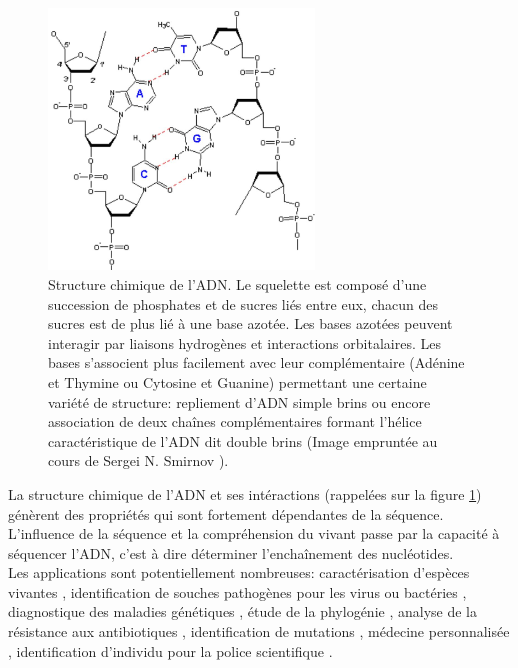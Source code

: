 \begin{figure}[H]
\begin{center}
\includegraphics[width=0.63\textwidth]{adn.jpg}

\caption[Représentation de l'ADN]{Structure chimique de l'ADN. Le squelette est composé d'une succession de phosphates et de sucres liés entre eux, chacun des sucres est de plus lié à une base azotée. Les bases azotées peuvent interagir par liaisons hydrogènes et interactions orbitalaires. Les bases s'associent plus facilement avec leur complémentaire (Adénine et Thymine ou Cytosine et Guanine) permettant une certaine variété de structure: repliement d'ADN simple brins ou encore association de deux cha\^{i}nes complémentaires formant l'hélice caractéristique de l'ADN dit double brins (Image empruntée au cours de Sergei N. Smirnov \cite{adnjpg}).}
\label{adn}
\end{center}
\end{figure}

La structure chimique de l'ADN et ses intéractions (rappelées sur la figure \ref{adn}) génèrent des propriétés qui sont fortement dépendantes de la séquence. L'influence de la séquence et la compréhension du vivant passe par la capacité à séquencer l'ADN, c'est à dire déterminer l'enchaînement des nucléotides. \\

Les applications sont potentiellement nombreuses: caractérisation d'espèces vivantes \cite{Sanggaard2014}, identification de souches pathogènes pour les virus ou bactéries \cite{Janda2007}, diagnostique des maladies génétiques \cite{Saunders2012}, étude de la phylogénie \cite{Neves2011}, analyse de la résistance aux antibiotiques  \cite{Davies2010}, identification de mutations \cite{Schneeberger2009}, médecine personnalisée \cite{Hamburg2010}, identification d'individu pour la police scientifique \cite{Wilson1995}.\\


